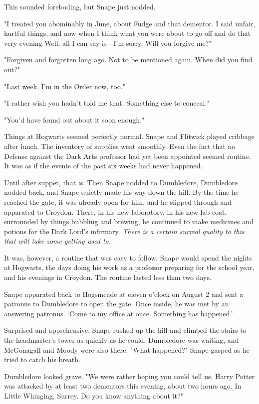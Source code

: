 This sounded foreboding, but Snape just nodded.

"I treated you abominably in June, about Fudge and that dementor. I said unfair, hurtful things, and now when I think what you were about to go off and do that very evening{\el} Well, all I can say is—I'm sorry. Will you forgive me?"

"Forgiven and forgotten long ago. Not to be mentioned again. When did you find out?"

"Last week. I'm in the Order now, too."

"I rather wish you hadn't told me that. Something else to conceal."

"You'd have found out about it soon enough."

Things at Hogwarts seemed perfectly normal. Snape and Flitwick played cribbage after lunch. The inventory of supplies went smoothly. Even the fact that no Defense against the Dark Arts professor had yet been appointed seemed routine. It was as if the events of the past six weeks had never happened.

Until after supper, that is. Then Snape nodded to Dumbledore, Dumbledore nodded back, and Snape quietly made his way down the hill. By the time he reached the gate, it was already open for him, and he slipped through and apparated to Croydon. There, in his new laboratory, in his new lab coat, surrounded by things bubbling and brewing, he continued to make medicines and potions for the Dark Lord's infirmary. \emph{There is a certain surreal quality to this that will take some getting used to.}

It was, however, a routine that was easy to follow. Snape would spend the nights at Hogwarts, the days doing his work as a professor preparing for the school year, and his evenings in Croydon. The routine lasted less than two days.

Snape apparated back to Hogsmeade at eleven o'clock on August 2 and sent a patronus to Dumbledore to open the gate. Once inside, he was met by an answering patronus. `Come to my office at once. Something has happened.'

Surprised and apprehensive, Snape rushed up the hill and climbed the stairs to the headmaster's tower as quickly as he could. Dumbledore was waiting, and McGonagall and Moody were also there. "What happened?" Snape gasped as he tried to catch his breath.

Dumbledore looked grave. "We were rather hoping you could tell us. Harry Potter was attacked by at least two dementors this evening, about two hours ago. In Little Whinging, Surrey. Do you know anything about it?"

